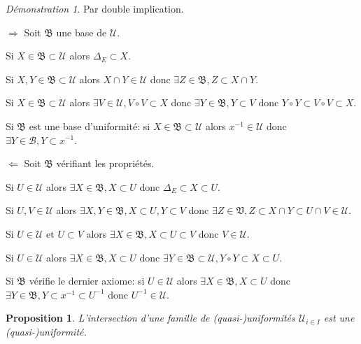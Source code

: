 \documentclass[a4paper, 11pt, french]{book}
\newenvironment{itemise}{\itemize}{\enditemize}
\theoremstyle{plain} %
\newtheorem{proposition}{Proposition}
\theoremstyle{definition} %
\theoremstyle{remark} %
\newtheorem*{demonstration}{Démonstration}
\newcommand{\1}{\mathds{1}}
\newcommand{\inv}[1]{#1^{-1}}
\begin{document}
\begin{demonstration}
	Par double implication.
	\begin{itemise}
		\item[$\Rightarrow$] Soit $\mathfrak{B}$ une base de $\mathscr{U}$.
		\begin{itemise}
			\item Si $X\in\mathfrak{B}\subset\mathscr{U}$ alors $\Delta_E\subset X$.
			\item Si $X, Y\in\mathfrak{B}\subset\mathscr{U}$ alors $X\cap Y\in\mathscr{U}$ donc $\exists Z\in\mathfrak{B}, Z\subset X\cap Y$.
			\item Si $X\in\mathfrak{B}\subset\mathscr{U}$ alors $\exists V\in\mathscr{U}, V\circ V\subset X$ donc $\exists Y\in\mathfrak{B}, Y\subset V$ donc $Y\circ Y\subset V\circ V\subset X$.
			\item Si $\mathfrak{B}$ est une base d'uniformité: si $X\in\mathfrak{B}\subset\mathscr{U}$ alors $ x^{-1}\in\mathscr{U}$ donc $\exists Y\in\mathscr{B}, Y\subset x^{-1}$.
		\end{itemise}
		\item[$\Leftarrow$] Soit $\mathfrak{B}$ vérifiant les propriétés.
		\begin{itemise}
			\item Si $U\in\mathscr{U}$ alors $\exists X\in\mathfrak{B}, X\subset U$ donc $\Delta_E\subset X\subset U$.
			\item Si $U, V\in\mathscr{U}$ alors $\exists X, Y\in\mathfrak{B}, X\subset U, Y\subset V$ donc $\exists Z\in\mathfrak{V}, Z\subset X\cap Y\subset U\cap V\in\mathscr{U}$.
			\item Si $U\in\mathscr{U}$ et $U\subset V$ alors $\exists X\in\mathfrak{B}, X\subset U\subset V$ donc $V\in\mathscr{U}$.
			\item Si $U\in\mathscr{U}$ alors $\exists X\in\mathfrak{B}, X\subset U$ donc $\exists Y\in\mathfrak{B}\subset\mathscr{U}, Y\circ Y\subset X\subset U$.
			\item Si $\mathfrak{B}$ vérifie le dernier axiome: si $U\in\mathscr{U}$ alors $\exists X\in\mathfrak{B}, X\subset U$ donc $\exists Y\in\mathfrak{B}, Y\subset x^{-1}\subset\inv{U}$ donc $\inv{U}\in\mathscr{U}$.
		\end{itemise}
	\end{itemise}
\end{demonstration}

\begin{proposition}
	L'intersection d'une famille de (quasi-)uniformités $\mathscr{U}_{i\in I}$ est une (quasi-)uniformité.
\end{proposition}
\end{document}
